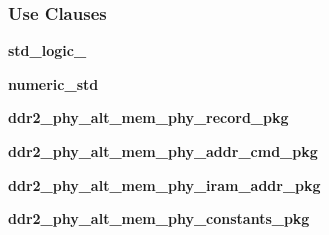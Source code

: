 \subsubsection*{Use Clauses}
 \begin{DoxyCompactItemize}
\item 
{\bf std\+\_\+logic\+\_}   
\item 
{\bf numeric\+\_\+std}   
\item 
{\bf ddr2\+\_\+phy\+\_\+alt\+\_\+mem\+\_\+phy\+\_\+record\+\_\+pkg}   
\item 
{\bf ddr2\+\_\+phy\+\_\+alt\+\_\+mem\+\_\+phy\+\_\+addr\+\_\+cmd\+\_\+pkg}   
\item 
{\bf ddr2\+\_\+phy\+\_\+alt\+\_\+mem\+\_\+phy\+\_\+iram\+\_\+addr\+\_\+pkg}   
\item 
{\bf ddr2\+\_\+phy\+\_\+alt\+\_\+mem\+\_\+phy\+\_\+constants\+\_\+pkg}   
\end{DoxyCompactItemize}

